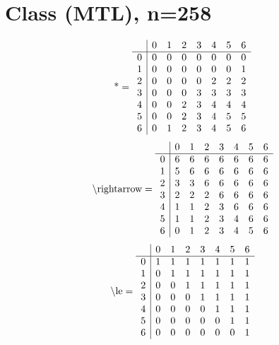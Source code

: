 \documentclass[11pt]{article}
\begin{document}
\section{Class (MTL), n=258}
\[\text{*} = 
\begin{array}{r | r r r r r r r}
 & 0 & 1 & 2 & 3 & 4 & 5 & 6 \\ \hline
0 & 0 & 0 & 0 & 0 & 0 & 0 & 0 \\
1 & 0 & 0 & 0 & 0 & 0 & 0 & 1 \\
2 & 0 & 0 & 0 & 0 & 2 & 2 & 2 \\
3 & 0 & 0 & 0 & 3 & 3 & 3 & 3 \\
4 & 0 & 0 & 2 & 3 & 4 & 4 & 4 \\
5 & 0 & 0 & 2 & 3 & 4 & 5 & 5 \\
6 & 0 & 1 & 2 & 3 & 4 & 5 & 6 \\
\end{array}
\]
\[\text{\textbackslash rightarrow} = 
\begin{array}{r | r r r r r r r}
 & 0 & 1 & 2 & 3 & 4 & 5 & 6 \\ \hline
0 & 6 & 6 & 6 & 6 & 6 & 6 & 6 \\
1 & 5 & 6 & 6 & 6 & 6 & 6 & 6 \\
2 & 3 & 3 & 6 & 6 & 6 & 6 & 6 \\
3 & 2 & 2 & 2 & 6 & 6 & 6 & 6 \\
4 & 1 & 1 & 2 & 3 & 6 & 6 & 6 \\
5 & 1 & 1 & 2 & 3 & 4 & 6 & 6 \\
6 & 0 & 1 & 2 & 3 & 4 & 5 & 6 \\
\end{array}
\]
\[\text{\textbackslash le} = 
\begin{array}{r | r r r r r r r}
 & 0 & 1 & 2 & 3 & 4 & 5 & 6 \\ \hline
0 & 1 & 1 & 1 & 1 & 1 & 1 & 1 \\
1 & 0 & 1 & 1 & 1 & 1 & 1 & 1 \\
2 & 0 & 0 & 1 & 1 & 1 & 1 & 1 \\
3 & 0 & 0 & 0 & 1 & 1 & 1 & 1 \\
4 & 0 & 0 & 0 & 0 & 1 & 1 & 1 \\
5 & 0 & 0 & 0 & 0 & 0 & 1 & 1 \\
6 & 0 & 0 & 0 & 0 & 0 & 0 & 1 \\
\end{array}
\]
\end{document}
